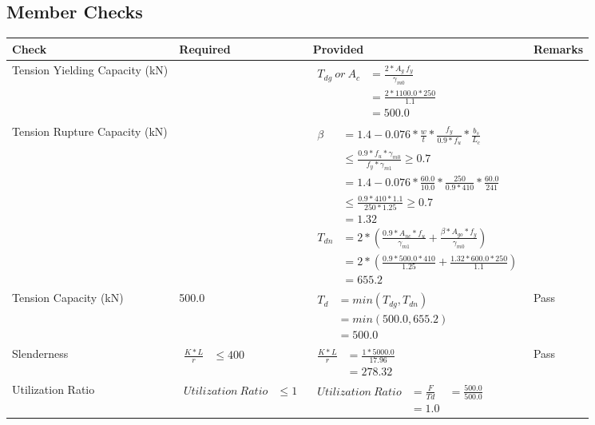 \documentclass{article}%
\begin{document}
\subsection{Member Checks}%
\label{subsec:MemberChecks}%
\renewcommand{\arraystretch}{1.2}%
\begin{longtable}{|p{2.5cm}|p{4.5cm}|p{8cm}|p{1cm}|}%
\hline%
\rowcolor{OsdagGreen}%
Check&Required&Provided&Remarks\\%
\hline%
\endhead%
\hline%
Tension Yielding Capacity (kN)&&$\begin{aligned}T_{dg}~or~A_c&= \frac{2 * A_g ~ f_y}{\gamma_{m0}}\\ &= \frac{2*1100.0*250}{1.1}\\ &= 500.0\end{aligned}$&\\%
\hline%
Tension Rupture Capacity (kN)&&$\begin{aligned}\beta &= 1.4 - 0.076*\frac{w}{t}*\frac{f_{y}}{0.9*f_{u}}*\frac{b_s}{L_c}\\ &\leq\frac{0.9*f_{u}*\gamma_{m0}}{f_{y}*\gamma_{m1}} \geq 0.7 \\ &= 1.4 - 0.076*\frac{60.0}{10.0}*\frac{250}{0.9*410}*\frac{60.0}{241 }\\ &\leq\frac{0.9* 410*1.1}{250*1.25} \geq 0.7 \\ &= 1.32\\ T_{dn} &= 2*(\frac{0.9*A_{nc}*f_{u}}{\gamma_{m1}} + \frac{\beta * A_{go} * f_{y}}{\gamma_{m0}})\\ &= 2*(\frac{0.9* 500.0*410}{1.25} + \frac{1.32*600.0*250}{1.1})\\ &= 655.2\end{aligned}$&\\%
\hline%
Tension Capacity (kN)&500.0&$\begin{aligned} T_d &= min(T_{dg},T_{dn})\\ &= min(500.0,655.2)\\ &=500.0\end{aligned}$&Pass\\%
\hline%
Slenderness&$\begin{aligned}\frac{K * L}{r} &\leq 400\end{aligned}$&$\begin{aligned}\frac{K * L}{r} &= \frac{1*5000.0}{17.96}\\ &= 278.32\end{aligned}$&Pass\\%
\hline%
Utilization Ratio&$\begin{aligned} Utilization~Ratio &\leq 1 \end{aligned}$&$\begin{aligned} Utilization~Ratio &= \frac{F}{Td}&=\frac{500.0}{500.0}\\ &= 1.0\end{aligned}$&\\%

\end{longtable}
\end{document}
